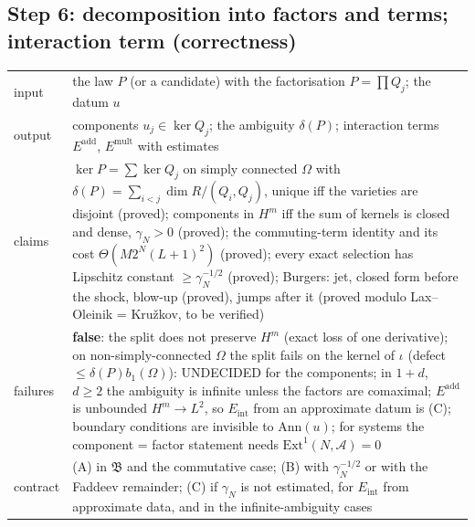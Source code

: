 \documentclass[11pt]{article}
\theoremstyle{plain}
\theoremstyle{definition}
\theoremstyle{remark}
\newcommand{\gN}{\gamma_{N}}                %
\newcommand{\lab}[1]{\textsf{#1}}           %
\newcommand{\UND}{\lab{UNDECIDED}}
\begin{document}
\subsection*{Step 6: decomposition into factors and terms; interaction term (correctness)}
\begin{tabular}{@{}p{2.2cm}p{9.6cm}@{}}
\toprule
input & the law $P$ (or a candidate) with the factorisation $P=\prod Q_j$; the datum $u$\\
output & components $u_j\in\ker Q_j$; the ambiguity $\delta(P)$; interaction terms $E^{\mathrm{add}}$, $E^{\mathrm{mult}}$ with estimates\\
claims & $\ker P=\sum\ker Q_j$ on simply connected $\Omega$ with $\delta(P)=\sum_{i<j}\dim R/(Q_i,Q_j)$, unique iff the varieties are disjoint (proved); components in $H^m$ iff the sum of kernels is closed and dense, $\gN>0$ (proved); the commuting-term identity and its cost $\Theta(M2^N(L+1)^2)$ (proved); every exact selection has Lipschitz constant $\ge\gN^{-1/2}$ (proved); Burgers: jet, closed form before the shock, blow-up (proved), jumps after it (proved modulo Lax--Oleinik = Kru\v zkov, to be verified)\\
failures & \textbf{false}: the split does not preserve $H^m$ (exact loss of one derivative); on non-simply-connected $\Omega$ the split fails on the kernel of $\iota$ (defect $\le\delta(P)b_1(\Omega)$): \UND{} for the components; in $1{+}d$, $d\ge2$ the ambiguity is infinite unless the factors are comaximal; $E^{\mathrm{add}}$ is unbounded $H^m\to L^2$, so $E_{\mathrm{int}}$ from an approximate datum is (C); boundary conditions are invisible to $\mathrm{Ann}(u)$; for systems the component = factor statement needs $\mathrm{Ext}^1(N,\mathcal A)=0$\\
contract & (A) in $\mathfrak B$ and the commutative case; (B) with $\gN^{-1/2}$ or with the Faddeev remainder; (C) if $\gN$ is not estimated, for $E_{\mathrm{int}}$ from approximate data, and in the infinite-ambiguity cases\\
\bottomrule
\end{tabular}
\end{document}
